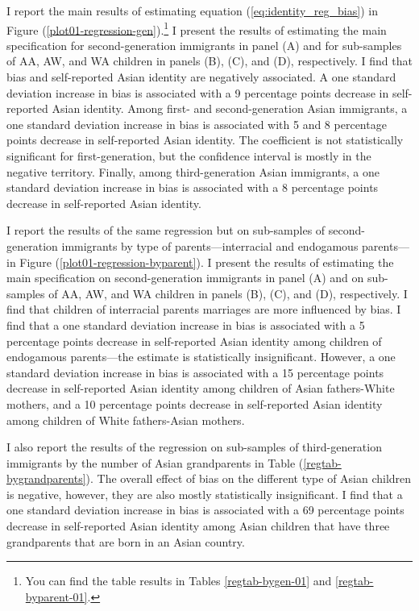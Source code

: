 I report the main results of estimating equation (\ref{eq:identity_reg_bias}) in Figure (\ref{plot01-regression-gen}).\footnote{You can find the table results in Tables \ref{regtab-bygen-01} and \ref{regtab-byparent-01}.} I present the results of estimating the main specification for second-generation immigrants in panel (A) and for sub-samples of AA, AW, and WA children in panels (B), (C), and (D), respectively. I find that bias and self-reported Asian identity are negatively associated. A one standard deviation increase in bias is associated with a 9 percentage points decrease in self-reported Asian identity. Among first- and second-generation Asian immigrants, a one standard deviation increase in bias is associated with 5 and 8 percentage points decrease in self-reported Asian identity. The coefficient is not statistically significant for first-generation, but the confidence interval is mostly in the negative territory. Finally, among third-generation Asian immigrants, a one standard deviation increase in bias is associated with a 8 percentage points decrease in self-reported Asian identity.

I report the results of the same regression but on sub-samples of second-generation immigrants by type of parents---interracial and endogamous parents---in Figure (\ref{plot01-regression-byparent}). I present the results of estimating the main specification on second-generation immigrants in panel (A) and on sub-samples of AA, AW, and WA children in panels (B), (C), and (D), respectively. I find that children of interracial parents marriages are more influenced by bias. I find that a one standard deviation increase in bias is associated with a 5 percentage points decrease in self-reported Asian identity among children of endogamous parents---the estimate is statistically insignificant. However, a one standard deviation increase in bias is associated with a 15 percentage points decrease in self-reported Asian identity among children of Asian fathers-White mothers, and a 10 percentage points decrease in self-reported Asian identity among children of White fathers-Asian mothers.

I also report the results of the regression on sub-samples of third-generation immigrants by the number of Asian grandparents in Table (\ref{regtab-bygrandparents}). The overall effect of bias on the different type of Asian children is negative, however, they are also mostly statistically insignificant. I find that a one standard deviation increase in bias is associated with a 69 percentage points decrease in self-reported Asian identity among Asian children that have three grandparents that are born in an Asian country.

